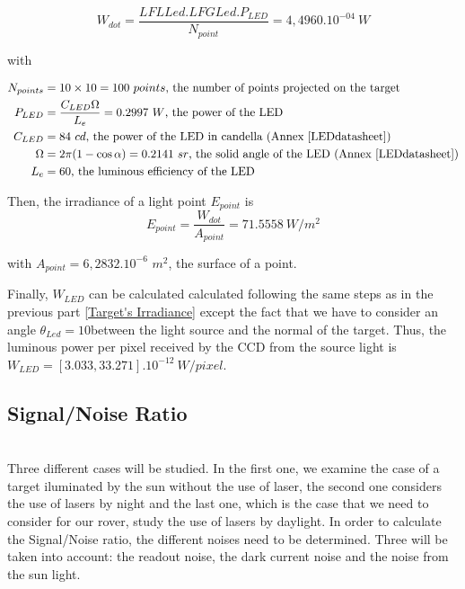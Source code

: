 \begin{equation}
\label{eq:powerpoint}
W_{dot} = \frac{LFLLed.LFGLed.P_{LED}}{N_{point}} = 4,4960.10^{-04}\ W
\end{equation}

with

\begin{align*}
N_{points} & = 10\times 10 = 100\ points\mbox{, the number of points projected on the  target}\\
P_{LED} & = \frac{C_{LED}\Omega}{L_e} = 0.2997\ W\mbox{, the power of the LED}\\
C_{LED} & = 84\ cd\mbox{, the power of the LED in candella (Annex \ref{LEDdatasheet})}\\
\Omega & = 2\pi (1-\cos \alpha) = 0.2141\ sr\mbox{, the solid angle of the LED (Annex \ref{LEDdatasheet})}\\
L_e & = 60\mbox{, the luminous efficiency of the LED}
\end{align*}

Then, the irradiance of a light point $E_{point}$ is
\begin{equation}
E_{point} = \frac{W_{dot}}{A_{point}} = 71.5558\ W/m^2
\end{equation}

with $A_{point} = 6,2832.10^{-6}$ $m^2$, the surface of a point.

Finally, $W_{LED}$ can be calculated calculated following the same steps as in the previous part \ref{Target's Irradiance} except the fact that we have to consider an angle $\theta_{Led} = 10$\textdegree between the light source and the normal of the target. Thus, the luminous power per pixel received by the CCD from the source light is $W_{LED} = [3.033, 33.271].10^{-12}\ W/pixel$.






\subsection{Signal/Noise Ratio}
~\\
Three different cases will be studied. In the first one, we examine the case of a target iluminated by the sun without the use of laser, the second one considers the use of lasers by night and the last one, which is the case that we need to consider for our rover, study the use of lasers by daylight.
In order to calculate the Signal/Noise ratio, the different noises need to be determined. Three will be taken into account: the readout noise, the dark current noise and the noise from the sun light. 


